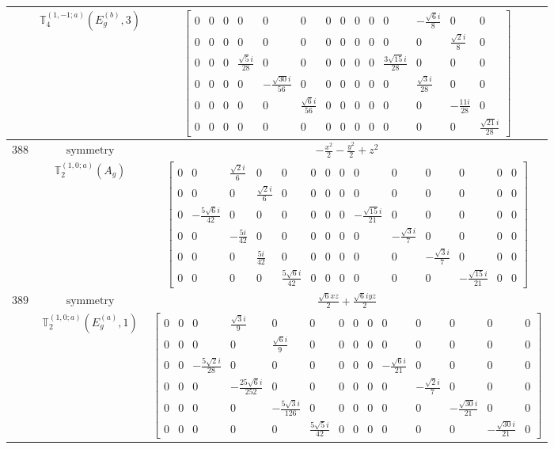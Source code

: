 \documentclass[fleqn,8pt,landscape]{jsarticle}
\begin{document}
\begin{longtable}{ccc}
$  $ & $ \mathbb{T}_{4}^{(1,-1;a)}(E_{g}^{(b)},3) $ & $ \begin{bmatrix} 0 & 0 & 0 & 0 & 0 & 0 & 0 & 0 & 0 & 0 & 0 & - \frac{\sqrt{6} i}{8} & 0 & 0 \\ 0 & 0 & 0 & 0 & 0 & 0 & 0 & 0 & 0 & 0 & 0 & 0 & \frac{\sqrt{2} i}{8} & 0 \\ 0 & 0 & 0 & \frac{\sqrt{5} i}{28} & 0 & 0 & 0 & 0 & 0 & 0 & \frac{3 \sqrt{15} i}{28} & 0 & 0 & 0 \\ 0 & 0 & 0 & 0 & - \frac{\sqrt{30} i}{56} & 0 & 0 & 0 & 0 & 0 & 0 & \frac{\sqrt{3} i}{28} & 0 & 0 \\ 0 & 0 & 0 & 0 & 0 & \frac{\sqrt{6} i}{56} & 0 & 0 & 0 & 0 & 0 & 0 & - \frac{11 i}{28} & 0 \\ 0 & 0 & 0 & 0 & 0 & 0 & 0 & 0 & 0 & 0 & 0 & 0 & 0 & \frac{\sqrt{21} i}{28} \end{bmatrix} $ \\ \hline
$ 388 $ & $ \text{symmetry} $ & $ - \frac{x^{2}}{2} - \frac{y^{2}}{2} + z^{2} $ \\
$  $ & $ \mathbb{T}_{2}^{(1,0;a)}(A_{g}) $ & $ \begin{bmatrix} 0 & 0 & \frac{\sqrt{2} i}{6} & 0 & 0 & 0 & 0 & 0 & 0 & 0 & 0 & 0 & 0 & 0 \\ 0 & 0 & 0 & \frac{\sqrt{2} i}{6} & 0 & 0 & 0 & 0 & 0 & 0 & 0 & 0 & 0 & 0 \\ 0 & - \frac{5 \sqrt{6} i}{42} & 0 & 0 & 0 & 0 & 0 & 0 & - \frac{\sqrt{15} i}{21} & 0 & 0 & 0 & 0 & 0 \\ 0 & 0 & - \frac{5 i}{42} & 0 & 0 & 0 & 0 & 0 & 0 & - \frac{\sqrt{3} i}{7} & 0 & 0 & 0 & 0 \\ 0 & 0 & 0 & \frac{5 i}{42} & 0 & 0 & 0 & 0 & 0 & 0 & - \frac{\sqrt{3} i}{7} & 0 & 0 & 0 \\ 0 & 0 & 0 & 0 & \frac{5 \sqrt{6} i}{42} & 0 & 0 & 0 & 0 & 0 & 0 & - \frac{\sqrt{15} i}{21} & 0 & 0 \end{bmatrix} $ \\ \hline
$ 389 $ & $ \text{symmetry} $ & $ \frac{\sqrt{6} x z}{2} + \frac{\sqrt{6} i y z}{2} $ \\
$  $ & $ \mathbb{T}_{2}^{(1,0;a)}(E_{g}^{(a)},1) $ & $ \begin{bmatrix} 0 & 0 & 0 & \frac{\sqrt{3} i}{9} & 0 & 0 & 0 & 0 & 0 & 0 & 0 & 0 & 0 & 0 \\ 0 & 0 & 0 & 0 & \frac{\sqrt{6} i}{9} & 0 & 0 & 0 & 0 & 0 & 0 & 0 & 0 & 0 \\ 0 & 0 & - \frac{5 \sqrt{2} i}{28} & 0 & 0 & 0 & 0 & 0 & 0 & - \frac{\sqrt{6} i}{21} & 0 & 0 & 0 & 0 \\ 0 & 0 & 0 & - \frac{25 \sqrt{6} i}{252} & 0 & 0 & 0 & 0 & 0 & 0 & - \frac{\sqrt{2} i}{7} & 0 & 0 & 0 \\ 0 & 0 & 0 & 0 & - \frac{5 \sqrt{3} i}{126} & 0 & 0 & 0 & 0 & 0 & 0 & - \frac{\sqrt{30} i}{21} & 0 & 0 \\ 0 & 0 & 0 & 0 & 0 & \frac{5 \sqrt{5} i}{42} & 0 & 0 & 0 & 0 & 0 & 0 & - \frac{\sqrt{30} i}{21} & 0 \end{bmatrix} $ \\ \hline

\end{longtable}
\end{document}
